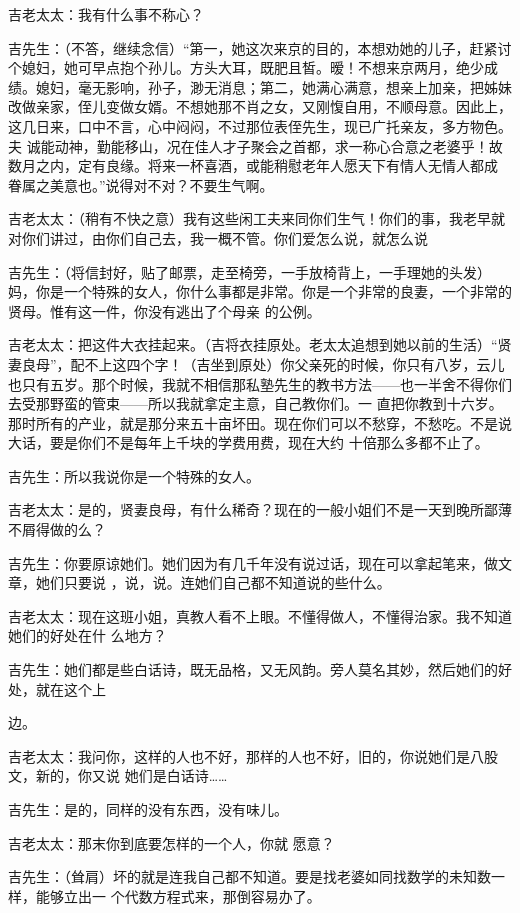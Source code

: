 \documentclass{article}
\begin{document}
吉老太太：我有什么事不称心？ 

吉先生：（不答，继续念信）“第一，她这次来京的目的，本想劝她的儿子，赶紧讨个媳妇，她可早点抱个孙儿。方头大耳，既肥且皙。暧！不想来京两月，绝少成绩。媳妇，毫无影响，孙子，渺无消息；第二，她满心满意，想亲上加亲，把姊妹改做亲家，侄儿变做女婿。不想她那不肖之女，又刚愎自用，不顺母意。因此上，这几日来，口中不言，心中闷闷，不过那位表侄先生，现已广托亲友，多方物色。夫
\newpage
诚能动神，勤能移山，况在佳人才子聚会之首都，求一称心合意之老婆乎！故数月之内，定有良缘。将来一杯喜酒，或能稍慰老年人愿天下有情人无情人都成
眷属之美意也。”说得对不对？不要生气啊。 

吉老太太：（稍有不快之意）我有这些闲工夫来同你们生气！你们的事，我老早就对你们讲过，由你们自己去，我一概不管。你们爱怎么说，就怎么说

吉先生：（将信封好，贴了邮票，走至椅旁，一手放椅背上，一手理她的头发）妈，你是一个特殊的女人，你什么事都是非常。你是一个非常的良妻，一个非常的贤母。惟有这一件，你没有逃出了个母亲
的公例。 

吉老太太：把这件大衣挂起来。（吉将衣挂原处。老太太追想到她以前的生活）“贤妻良母”，配不上这四个字！（吉坐到原处）你父亲死的时候，你只有八岁，云儿也只有五岁。那个时候，我就不相信那私塾先生的教书方法——也一半舍不得你们去受那野蛮的管束——所以我就拿定主意，自己教你们。一
\newpage
直把你教到十六岁。那时所有的产业，就是那分来五十亩坏田。现在你们可以不愁穿，不愁吃。不是说大话，要是你们不是每年上千块的学费用费，现在大约
十倍那么多都不止了。 


吉先生：所以我说你是一个特殊的女人。 

吉老太太：是的，贤妻良母，有什么稀奇？现在的一般小姐们不是一天到晚所鄙薄不屑得做的么？

吉先生：你要原谅她们。她们因为有几千年没有说过话，现在可以拿起笔来，做文章，她们只要说
，说，说。连她们自己都不知道说的些什么。 

吉老太太：现在这班小姐，真教人看不上眼。不懂得做人，不懂得治家。我不知道她们的好处在什
么地方？ 

吉先生：她们都是些白话诗，既无品格，又无风韵。旁人莫名其妙，然后她们的好处，就在这个上

\newpage
边。 

吉老太太：我问你，这样的人也不好，那样的人也不好，旧的，你说她们是八股文，新的，你又说
她们是白话诗…… 

吉先生：是的，同样的没有东西，没有味儿。

吉老太太：那末你到底要怎样的一个人，你就
愿意？ 

吉先生：（耸肩）坏的就是连我自己都不知道。要是找老婆如同找数学的未知数一样，能够立出一
个代数方程式来，那倒容易办了。 
\end{document}

